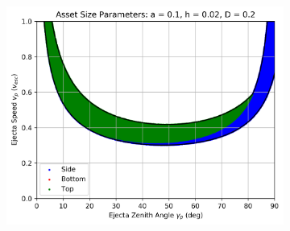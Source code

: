 \documentclass{article}
\begin{document}
\begin{figure}
	\begin{subfigure}[t]{.32\textwidth}
		\centering
		\includegraphics[width=.98\linewidth]{asset_speed_zenith_plot_1.000e-01_2.000e-02_2.000e-01.png}  
		\label{fig:sub-asset_speed_zenith_9}
	\end{subfigure}
	

\end{figure}
\end{document}
